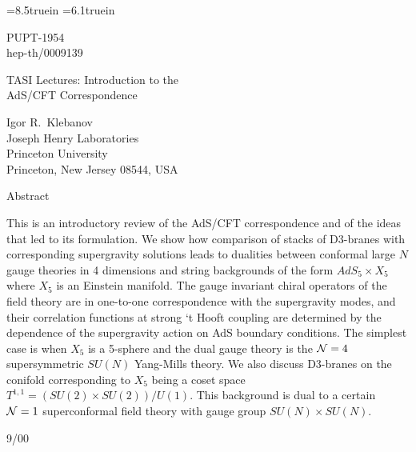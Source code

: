 \textheight=8.5truein
\textwidth=6.1truein

\overfullrule=0pt
\parskip=2pt
\parindent=12pt
\headheight=0in
\headsep=0in
\topmargin=0in
\oddsidemargin=0in





\baselineskip=15.5pt
\pagestyle{plain}
\setcounter{page}{1}

\renewcommand{\thefootnote}{\fnsymbol{footnote}}


\begin{titlepage}

\begin{flushright}
PUPT-1954\\
hep-th/0009139
\end{flushright}
\vfil

\begin{center}
{\huge TASI Lectures:
 Introduction to the \\} 
 \vspace{3 mm}
{\huge AdS/CFT Correspondence
}

\end{center}

\vfil

\begin{center}
{\large Igor R.\ Klebanov}\\
\vspace{3mm}
Joseph Henry Laboratories\\
Princeton University\\
Princeton, New Jersey 08544, USA\\
\vspace{3mm}
\end{center}

\vfil

\begin{center}
{\large Abstract}
\end{center}

\noindent
This is an introductory review of the AdS/CFT correspondence
and of the ideas that led to its formulation. We show how
comparison of stacks of D3-branes with corresponding supergravity
solutions leads
to dualities between conformal large $N$ gauge theories in
4 dimensions and string backgrounds of the form $AdS_5\times X_5$
where $X_5$ is an Einstein manifold. 
The gauge invariant chiral operators of the field theory
are in one-to-one correspondence with the supergravity modes,
and their correlation functions at strong `t Hooft coupling are
determined by the dependence of the supergravity action on AdS
boundary conditions. The simplest case
is when $X_5$ is a 5-sphere and the dual gauge theory is the
${\cal N}=4$ supersymmetric $SU(N)$ Yang-Mills theory. We also discuss
D3-branes on the conifold corresponding
to $X_5$ being a coset space $T^{1,1}=(SU(2)\times SU(2))/U(1)$.
This background is dual to a certain ${\cal N}=1$ superconformal field theory 
with gauge group $SU(N)\times SU(N)$.
\vfil
\begin{flushleft}
9/00
\end{flushleft}
\end{titlepage}
\newpage

